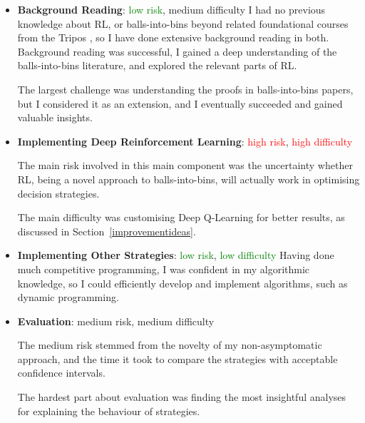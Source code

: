\begin{itemize}

    \item \textbf{Background Reading}: \textcolor{green}{low risk}, \textcolor{YellowOrange}{medium difficulty}
    I had no previous knowledge about RL, or balls-into-bins beyond related foundational courses from the Tripos , so I have done extensive background reading in both. Background reading was successful, I gained a deep understanding of the balls-into-bins literature, and explored the relevant parts of RL.
    
    The largest challenge was understanding the proofs in balls-into-bins papers, but I considered it as an extension, and I eventually succeeded and gained valuable insights.
    
    \item \textbf{Implementing Deep Reinforcement Learning}: \textcolor{red}{high risk}, \textcolor{red}{high difficulty}
    
    The main risk involved in this main component was the uncertainty whether RL, being a novel approach to balls-into-bins, will actually work in optimising decision strategies. 
    
    The main difficulty was customising Deep Q-Learning for better results, as discussed in Section~\ref{improvementideas}.
    
    \item \textbf{Implementing Other Strategies}: \textcolor{green}{low risk}, \textcolor{green}{low difficulty}
    Having done much competitive programming, I was confident in my algorithmic knowledge, so I could efficiently develop and implement algorithms, such as dynamic programming.
    
    \item \textbf{Evaluation}: \textcolor{YellowOrange}{medium risk}, \textcolor{YellowOrange}{medium difficulty}
    
    The medium risk stemmed from the novelty of my non-asymptomatic approach, and the time it took to compare the strategies with acceptable confidence intervals.
    
    The hardest part about evaluation was finding the most insightful analyses for explaining the behaviour of strategies.
    
    
\end{itemize}